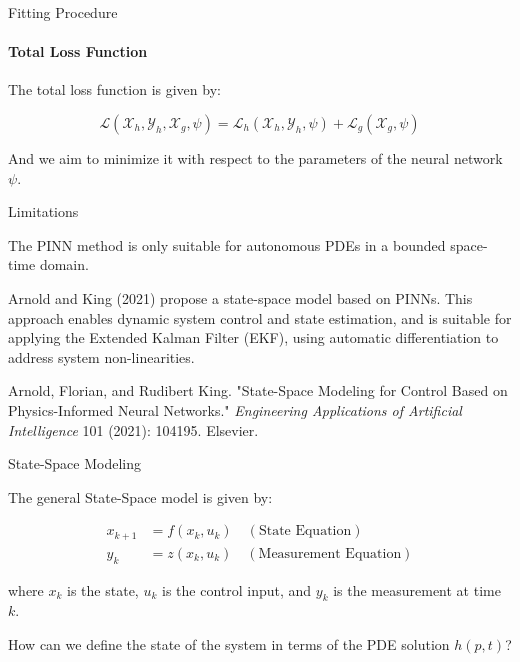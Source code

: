 \begin{frame}{Fitting Procedure}
\framesubtitle{Total Loss Function}

The total loss function is given by:

\begin{equation}
    \mathcal{L}(\mathcal{X}_h, \mathcal{Y}_h,\mathcal{X}_g, \psi) = \mathcal{L}_h (\mathcal{X}_h, \mathcal{Y}_h, \psi) + \mathcal{L}_g (\mathcal{X}_g, \psi)
\end{equation}

And we aim to minimize it with respect to the parameters of the neural network $\psi$.

\end{frame}

\begin{frame}{Limitations}
    
The PINN method is only suitable for autonomous PDEs in a bounded space-time domain.

Arnold and King (2021) propose a state-space model based on PINNs. This approach enables dynamic system control and state estimation, and is suitable for applying the Extended Kalman Filter (EKF), using automatic differentiation to address system non-linearities.


{\tiny Arnold, Florian, and Rudibert King. "State-Space Modeling for Control Based on Physics-Informed Neural Networks." \textit{Engineering Applications of Artificial Intelligence} 101 (2021): 104195. Elsevier.}
\end{frame}

\begin{frame}{State-Space Modeling}

The general State-Space model is given by:

\begin{align}
x_{k+1}  &= f(x_k, u_k) \quad (\text{State Equation})\\
y_k &= z(x_k, u_k) \quad (\text{Measurement Equation})
\end{align}

where $x_k$ is the state, $u_k$ is the control input, and $y_k$ is the measurement at time $k$.

How can we define the state of the system in terms of the PDE solution $h(p, t)$?
\end{frame}

